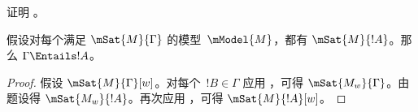 \documentclass[../../../include/open-logic-section]{subfiles}
\begin{document}
\begin{prob}
  证明 。
\end{prob}

\begin{prop}
  假设对每个满足 $\mSat{M}{\Gamma}$ 的模型~$\mModel{M}$，都有 $\mSat{M}{!A}$。那么 $\Gamma \Entails !A$。
\end{prop}

\begin{proof}
  假设 $\mSat{M}{\Gamma}[w]$。对每个~$!B \in \Gamma$ 应用 ，可得 $\mSat{M_w}{\Gamma}$。由题设得 $\mSat{M_w}{!A}$。再次应用 ，可得 $\mSat{M}{!A}[w]$。
\end{proof}
\end{document}

